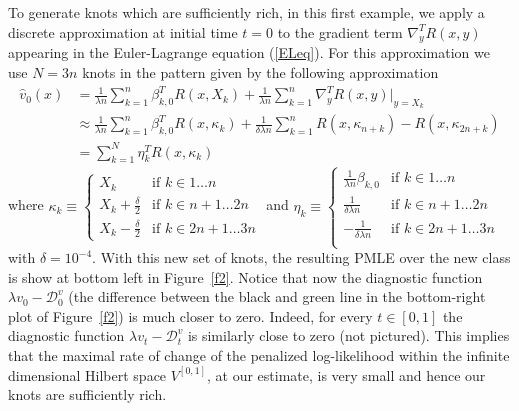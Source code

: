 \documentclass[noinfoline]{imsart}
\begin{document}
To generate  knots which are sufficiently rich, in this first example,  we apply a discrete approximation at initial time $t=0$ to the gradient term $ \nabla_{y}^T R(x,y) $ appearing in  the Euler-Lagrange equation (\ref{ELeq}).
 For this approximation we use $N=3n$ knots in the pattern given by the following approximation
\begin{align}
 \hat v_0(x)&=  \frac{1}{\lambda n}\sum_{k=1}^n \beta^T_{k,0} R(x,X_{k})  +  \frac{1}{\lambda n}\sum_{k=1}^n   \nabla^T_{y} R(x,y)\Bigr|_{y= X_{k}} \\
 & \approx \frac{1}{\lambda n}\sum_{k=1}^n \beta^T_{k,0} R(x,\kappa_{k})  +  \frac{1}{\delta \lambda n}\sum_{k=1}^n   R(x,\kappa_{n+k})-R(x,\kappa_{2n+k}) \\
 & = \sum_{k=1}^N \eta^T_{k} R(x,\kappa_{k}) \label{eq:etakappa}
\end{align}
where 
$\kappa_{k}\equiv\begin{cases}
X_{k} & \text{if $k \in 1 \dots n$} \\
X_{k}+\frac{\delta}{2} & \text{if $k \in n+1 \dots 2n$} \\
X_{k}-\frac{\delta}{2} & \text{if $k \in 2n+1\dots 3n$} 
\end{cases}$ and $\eta_{k}\equiv\begin{cases}
\frac{1}{\lambda n} \beta_{k,0} & \text{if $k \in 1 \dots n$} \\
\frac{1}{\delta \lambda n} & \text{if $k \in n+1 \dots 2n$} \\
-\frac{1}{\delta \lambda n} & \text{if $k \in 2n+1 \dots 3n$} \\
\end{cases}$
with $\delta=10^{-4}$. 
 With this new set of knots, the resulting PMLE over the new class is show at bottom left in Figure~\ref{f2}. Notice that now the diagnostic function $\lambda v_0 -\mathcal D_0^v$ (the difference between the black and green line in the bottom-right plot of Figure~\ref{f2}) is much closer to zero. Indeed, for every $t\in [0,1]$ the diagnostic function $\lambda v_t -\mathcal D_t^v$ is similarly close to zero (not pictured). This implies that the maximal rate of change  of the penalized log-likelihood within the infinite dimensional Hilbert space $V^{[0,1]}$, at our estimate, is very small and hence our knots are sufficiently rich.
 
 
   
\end{document}

